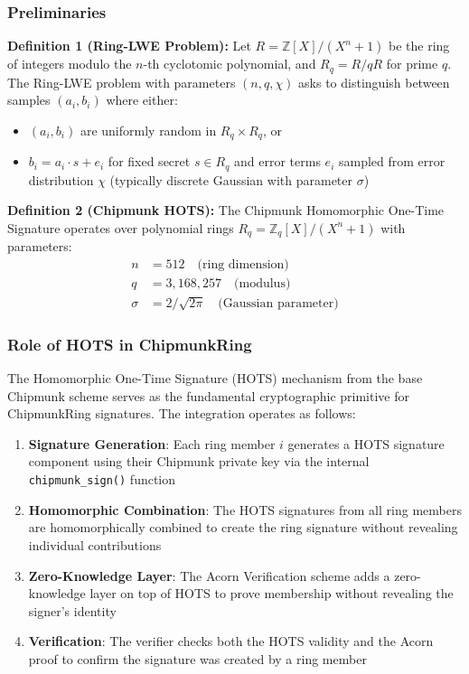 \documentclass[11pt,a4paper]{article}
\begin{document}
\subsubsection{Preliminaries}

\textbf{Definition 1 (Ring-LWE Problem):} Let $R = \mathbb{Z}[X]/(X^n + 1)$ be the ring of integers modulo the $n$-th cyclotomic polynomial, and $R_q = R/qR$ for prime $q$. The Ring-LWE problem with parameters $(n, q, \chi)$ asks to distinguish between samples $(a_i, b_i)$ where either:
\begin{itemize}
\item $(a_i, b_i)$ are uniformly random in $R_q \times R_q$, or  
\item $b_i = a_i \cdot s + e_i$ for fixed secret $s \in R_q$ and error terms $e_i$ sampled from error distribution $\chi$ (typically discrete Gaussian with parameter $\sigma$)
\end{itemize}

\textbf{Definition 2 (Chipmunk HOTS):} The Chipmunk Homomorphic One-Time Signature operates over polynomial rings $R_q = \mathbb{Z}_q[X]/(X^n + 1)$ with parameters:
\begin{align}
n &= 512 \quad \text{(ring dimension)} \\
q &= 3,168,257 \quad \text{(modulus)} \\
\sigma &= 2/\sqrt{2\pi} \quad \text{(Gaussian parameter)}
\end{align}

\subsubsection{Role of HOTS in ChipmunkRing}

The Homomorphic One-Time Signature (HOTS) mechanism from the base Chipmunk scheme serves as the fundamental cryptographic primitive for ChipmunkRing signatures. The integration operates as follows:

\begin{enumerate}
\item \textbf{Signature Generation}: Each ring member $i$ generates a HOTS signature component using their Chipmunk private key via the internal \texttt{chipmunk\_sign()} function
\item \textbf{Homomorphic Combination}: The HOTS signatures from all ring members are homomorphically combined to create the ring signature without revealing individual contributions
\item \textbf{Zero-Knowledge Layer}: The Acorn Verification scheme adds a zero-knowledge layer on top of HOTS to prove membership without revealing the signer's identity
\item \textbf{Verification}: The verifier checks both the HOTS validity and the Acorn proof to confirm the signature was created by a ring member
\end{enumerate}
\end{document}
